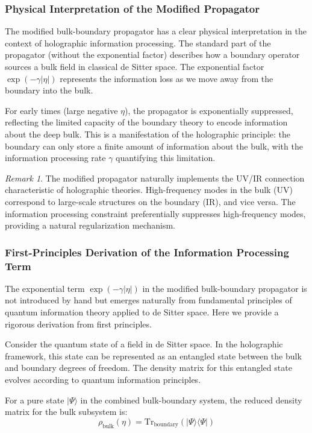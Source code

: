 \documentclass[11pt,english,twoside]{article}
\theoremstyle{plain}
\theoremstyle{definition}
\theoremstyle{remark}
\newtheorem{remark}[theorem]{Remark}
\newcommand{\gammaR}{\gamma}
\begin{document}
\subsubsection{Physical Interpretation of the Modified Propagator}

The modified bulk-boundary propagator has a clear physical interpretation in the context of holographic information processing. The standard part of the propagator (without the exponential factor) describes how a boundary operator sources a bulk field in classical de Sitter space. The exponential factor $\exp(-\gammaR|\eta|)$ represents the information loss as we move away from the boundary into the bulk.

For early times (large negative $\eta$), the propagator is exponentially suppressed, reflecting the limited capacity of the boundary theory to encode information about the deep bulk. This is a manifestation of the holographic principle: the boundary can only store a finite amount of information about the bulk, with the information processing rate $\gammaR$ quantifying this limitation.

\begin{remark}
The modified propagator naturally implements the UV/IR connection characteristic of holographic theories. High-frequency modes in the bulk (UV) correspond to large-scale structures on the boundary (IR), and vice versa. The information processing constraint preferentially suppresses high-frequency modes, providing a natural regularization mechanism.
\end{remark}

\subsubsection{First-Principles Derivation of the Information Processing Term}

The exponential term $\exp(-\gammaR|\eta|)$ in the modified bulk-boundary propagator is not introduced by hand but emerges naturally from fundamental principles of quantum information theory applied to de Sitter space. Here we provide a rigorous derivation from first principles.

Consider the quantum state of a field in de Sitter space. In the holographic framework, this state can be represented as an entangled state between the bulk and boundary degrees of freedom. The density matrix for this entangled state evolves according to quantum information principles.

For a pure state $|\Psi\rangle$ in the combined bulk-boundary system, the reduced density matrix for the bulk subsystem is:
\begin{equation}
\rho_{\text{bulk}}(\eta) = \text{Tr}_{\text{boundary}}(|\Psi\rangle\langle\Psi|)
\end{equation}
\end{document}
